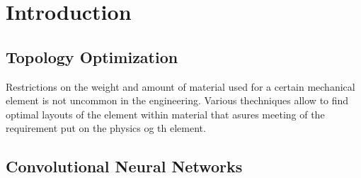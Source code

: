 \chapter{Introduction}
\label{chapter:Introduction}

\section{Topology Optimization}

Restrictions on the weight and amount of material used for a certain mechanical element is not uncommon in the engineering.
Various thechniques allow to find optimal layouts of the element within material that asures meeting of the requirement put on the physics og th element. 


\section{Convolutional Neural Networks}




